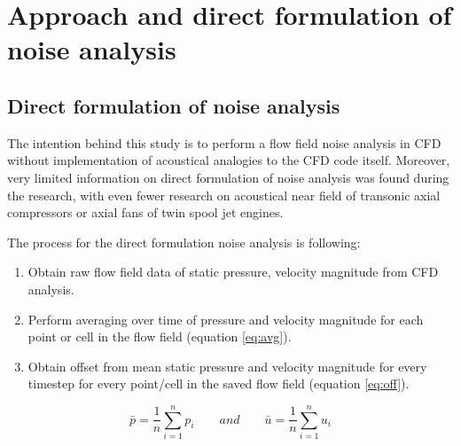 
\chapter{Approach and direct formulation of noise analysis} %
\label{approach} %


\section{Direct formulation of noise analysis} \label{direct_approach}
The intention behind this study is to perform a flow field noise analysis in CFD without implementation of acoustical analogies to the CFD code itself. Moreover, very limited information on direct formulation of noise analysis was found during the research, with even fewer research on acoustical near field of transonic axial compressors or axial fans of twin spool jet engines.

The process for the direct formulation noise analysis is following:
\begin{enumerate}
\item Obtain raw flow field data of static pressure, velocity magnitude from CFD analysis.
\item Perform averaging over time of pressure and velocity magnitude for each point or cell in the flow field (equation \ref{eq:avg}).
\item Obtain offset from mean static pressure and velocity magnitude for every timestep for every point/cell in the saved flow field (equation \ref{eq:off}).		
\end{enumerate}


\begin{equation} \label{eq:avg}
\bar{p} = \frac{1}{n} \sum_{i=1}^{n} p_i \qquad and \qquad \bar{u} = \frac{1}{n} \sum_{i=1}^{n} u_i
\end{equation}

